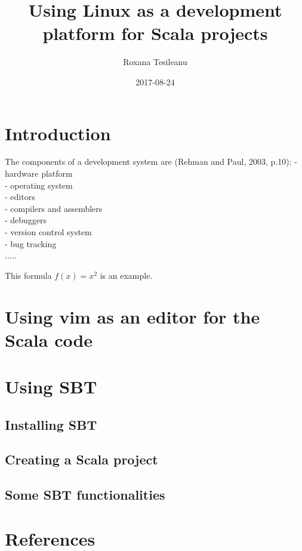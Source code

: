 \documentclass{article}
\title{Using Linux as a development platform for Scala projects}
\date{2017-08-24}
\author{Roxana Tesileanu}
\begin{document}
	\maketitle
	\newpage

\section{Introduction}
The components of a development system are (Rehman and Paul, 2003, p.10):\newline
- hardware platform \\
- operating system \\
- editors \\
- compilers and assemblers \\
- debuggers \\
- version control system \\
- bug tracking \\

.....

This formula $f(x) = x^2$ is an example.

\section{Using vim as an editor for the Scala code}
\section{Using SBT}
\subsection{Installing SBT}
\subsection{Creating a Scala project}
\subsection{Some SBT functionalities}
\section{References}

  
\end{document}
